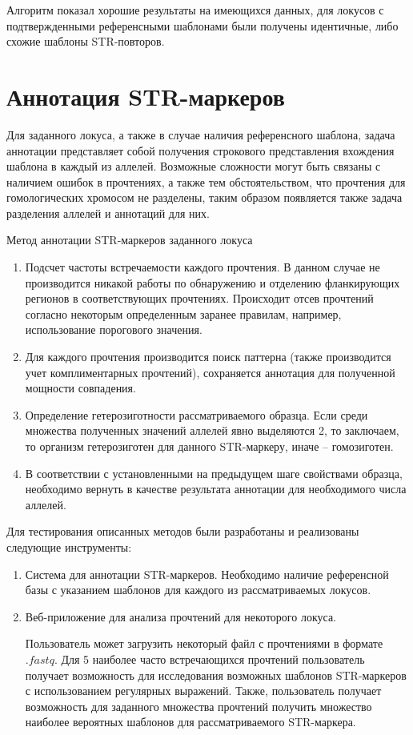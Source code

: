 Алгоритм показал хорошие результаты на имеющихся данных,
для локусов с подтвержденными референсными шаблонами были получены идентичные, либо схожие шаблоны
STR-повторов.

\section{Аннотация STR-маркеров}

Для заданного локуса, а также в случае наличия референсного шаблона, задача аннотации представляет
собой получения строкового представления вхождения шаблона в каждый из аллелей. Возможные
сложности могут быть связаны с наличием ошибок в прочтениях, а также тем обстоятельством, что прочтения
для гомологических хромосом не разделены, таким образом появляется также задача разделения аллелей
и аннотаций для них.

\Algorithm Метод аннотации STR-маркеров заданного локуса
\begin{enumerate}
  \item Подсчет частоты встречаемости каждого прочтения.
  В данном случае не производится никакой работы
  по обнаружению и отделению фланкирующих регионов в соответствующих прочтениях. Происходит отсев
  прочтений согласно некоторым определенным заранее правилам, например, использование порогового значения.

  \item Для каждого прочтения производится поиск паттерна (также производится учет комплиментарных прочтений),
  сохраняется аннотация для полученной мощности совпадения.

  \item Определение гетерозиготности рассматриваемого образца.
  Если среди множества полученных значений аллелей явно выделяются 2, то заключаем,
  то организм гетерозиготен для данного STR-маркеру,
  иначе -- гомозиготен.

  \item В соответствии с установленными на предыдущем шаге свойствами образца,
  необходимо вернуть в качестве результата аннотации для необходимого числа аллелей.
\end{enumerate}

Для тестирования описанных методов были разработаны и реализованы следующие инструменты:
\begin{enumerate}
  \item Система для аннотации STR-маркеров.
  Необходимо наличие референсной базы с указанием шаблонов для каждого из рассматриваемых локусов.

  \item Веб-приложение для анализа прочтений для некоторого локуса.

  Пользователь может загрузить некоторый файл с прочтениями в формате $.fastq$.
  Для 5 наиболее часто встречающихся прочтений пользователь получает возможность
  для исследования возможных шаблонов STR-маркеров с использованием регулярных выражений.
  Также, пользователь получает возможность для заданного множества прочтений получить
  множество наиболее вероятных шаблонов для рассматриваемого STR-маркера.

\end{enumerate}

